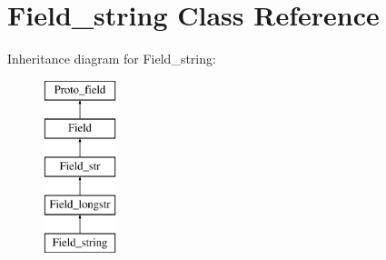 \hypertarget{classField__string}{}\section{Field\+\_\+string Class Reference}
\label{classField__string}
Inheritance diagram for Field\+\_\+string\+:\begin{figure}[H]
\begin{center}
\leavevmode
\includegraphics[height=5.000000cm]{classField__string}
\end{center}
\end{figure}
